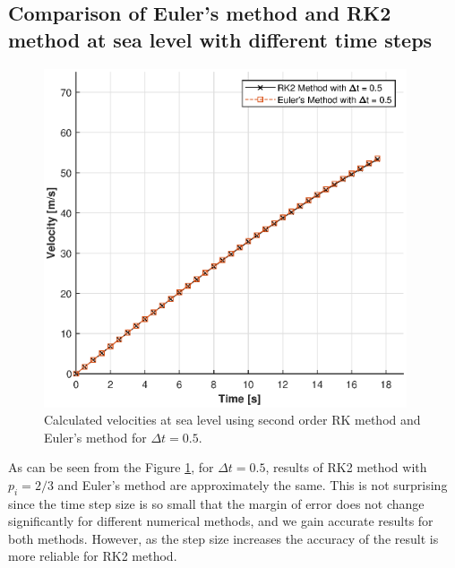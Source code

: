 \documentclass[letterpaper,12pt]{article}
\begin{document}
\subsection{Comparison of Euler's method and RK2 method at sea level with different time steps}
\begin{figure}[ht]
        \centering \includegraphics[max height=10cm]{graphs/compare05.eps}
        \caption{Calculated velocities at sea level using second order RK method and Euler's method for $\Delta t=0.5$.}
        \label{fig:rk2_05}
\end{figure}
As can be seen from the Figure \ref{fig:rk2_05}, for $\Delta t = 0.5$, results of RK2 method with $p_i=2/3$ and Euler's method
are approximately the same. This is not surprising since the time step size is so small that the margin of error does not change
significantly for different numerical methods, and we gain accurate results for both methods. However, as the step size increases
the accuracy of the result is more reliable for RK2 method.
\newpage
\end{document}
